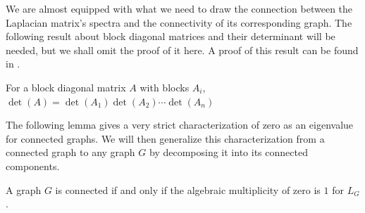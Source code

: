 \documentclass[11pt]{article}
\begin{document}
We are almost equipped with what we need to draw the connection between the Laplacian matrix's spectra and the connectivity of its corresponding graph. The following result about block diagonal matrices and their determinant will be needed, but we shall omit the proof of it here. A proof of this result can be found in \cite{silvester2000determinants}.

\begin{lemma}
    \label{lem:block_det}
    For a block diagonal matrix $A$ with blocks $A_i$, $\det(A) = \det(A_1) \det(A_2) \cdots \det(A_n)$
\end{lemma}

The following lemma gives a very strict characterization of zero as an eigenvalue for connected graphs. We will then generalize this characterization from a connected graph to any graph $G$ by decomposing it into its connected components.

\begin{lemma}
    \label{lem:eig0_iff_connected}
    A graph $G$ is connected if and only if the algebraic multiplicity of zero is $1$ for $L_G$.
\end{lemma}
\end{document}
